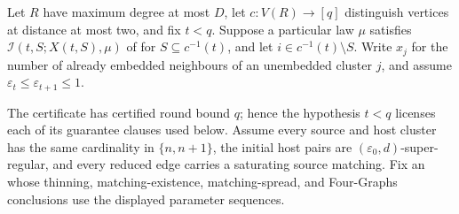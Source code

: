 \begin{lemma}
Let \(R\) have maximum degree at most \(D\), let \(c:V(R)\to[q]\)
distinguish vertices at distance at most two, and fix \(t<q\).
Suppose a particular law \(\mu\) satisfies
\(\mathcal I(t,S;X(t,S),\mu)\) of  for
\(S\subseteq c^{-1}(t)\), and let \(i\in c^{-1}(t)\setminus S\).
Write \(x_j\) for the number of already embedded neighbours of an
unembedded cluster \(j\), and assume
\(\varepsilon_t\leq\varepsilon_{t+1}\leq1\).

The certificate has certified round bound $q$; hence the hypothesis $t<q$
licenses each of its guarantee clauses used below.  Assume every source and host cluster has the same cardinality in
\(\{n,n+1\}\), the initial host pairs are
\((\varepsilon_0,d)\)-super-regular, and every reduced edge carries a
saturating source matching. Fix an 
whose thinning, matching-existence, matching-spread, and Four-Graphs
conclusions use the displayed parameter sequences.


\end{lemma}
